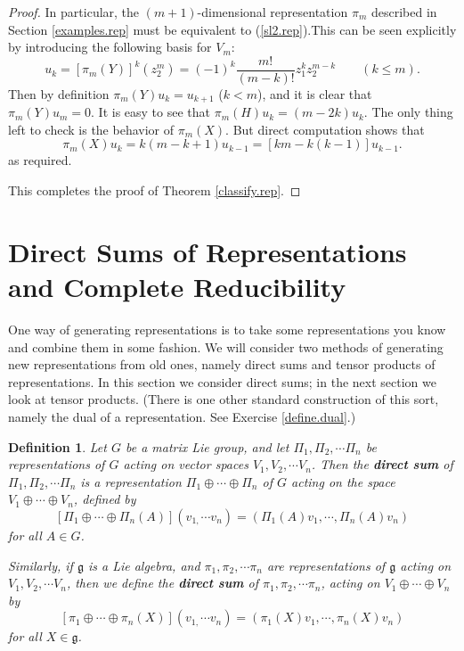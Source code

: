 \documentclass{amsbook}
\let \frak = \mathfrak
\theoremstyle{plain}
\newtheorem{definition}[theorem]{Definition}
\numberwithin{equation}{chapter}
\numberwithin{theorem}{chapter}
\begin{document}
\begin{proof}
In particular, the $(m+1)$-dimensional representation $\pi_{m}$ described in
Section \ref{examples.rep} must be equivalent to (\ref{sl2.rep}).This can be
seen explicitly by introducing the following basis for $V_{m}$:
\[
u_{k}=\left[  \pi_{m}(Y)\right]  ^{k}(z_{2}^{m})=(-1)^{k}\frac{m!}%
{(m-k)!}z_{1}^{k}z_{2}^{m-k}\qquad(k\leq m)\text{.}%
\]
Then by definition $\pi_{m}(Y)u_{k}=u_{k+1}$ ($k<m$), and it is clear that
$\pi_{m}(Y)u_{m}=0$. It is easy to see that $\pi_{m}(H)u_{k}=(m-2k)u_{k}$. The
only thing left to check is the behavior of $\pi_{m}(X)$. But direct
computation shows that
\[
\pi_{m}(X)u_{k}=k(m-k+1)u_{k-1}=\left[  km-k(k-1)\right]  u_{k-1}\text{.}%
\]
as required.

This completes the proof of Theorem \ref{classify.rep}.
\end{proof}

\section{Direct Sums of Representations and Complete Reducibility}

One way of generating representations is to take some representations you know
and combine them in some fashion. We will consider two methods of generating
new representations from old ones, namely direct sums and tensor products of
representations. In this section we consider direct sums; in the next section
we look at tensor products. (There is one other standard construction of this
sort, namely the dual of a representation. See Exercise \ref{define.dual}.)

\begin{definition}
Let $G$ be a matrix Lie group, and let $\Pi_{1},\Pi_{2},\cdots\Pi_{n}$ be
representations of $G$ acting on vector spaces $V_{1},V_{2},\cdots V_{n}$.
Then the \textbf{direct sum} of $\Pi_{1},\Pi_{2},\cdots\Pi_{n}$ is a
representation $\Pi_{1}\oplus\cdots\oplus\Pi_{n}$ of $G$ acting on the space
$V_{1}\oplus\cdots\oplus V_{n}$, defined by
\[
\left[  \Pi_{1}\oplus\cdots\oplus\Pi_{n}(A)\right]  \left(  v_{1,}\cdots
v_{n}\right)  =\left(  \Pi_{1}(A)v_{1},\cdots,\Pi_{n}(A)v_{n}\right)
\]
for all $A\in G$.

Similarly, if $\frak{g}$ is a Lie algebra, and $\pi_{1},\pi_{2},\cdots\pi_{n}$
are representations of $\frak{g}$ acting on $V_{1},V_{2},\cdots V_{n}$, then
we define the \textbf{direct sum} of $\pi_{1},\pi_{2},\cdots\pi_{n}$, acting
on $V_{1}\oplus\cdots\oplus V_{n}$ by
\[
\left[  \pi_{1}\oplus\cdots\oplus\pi_{n}(X)\right]  \left(  v_{1,}\cdots
v_{n}\right)  =\left(  \pi_{1}(X)v_{1},\cdots,\pi_{n}(X)v_{n}\right)
\]
for all $X\in\frak{g}$.
\end{definition}
\end{document}
